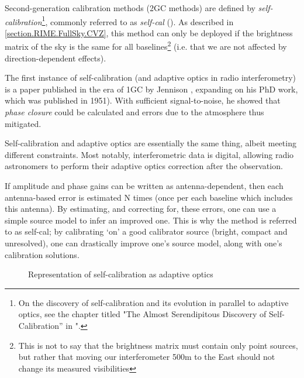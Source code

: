 \pg
Second-generation calibration methods (2GC methods) are defined by \emph{self-calibration}\footnote{On the discovery of self-calibration and its evolution in parallel to adaptive optics, see the chapter titled "The Almost Serendipitous Discovery of Self-Calibration'' in "\href{http://library.nrao.edu/public/collection/02000000000280.pdf}{\citep{serendipitous}}.}, commonly referred to as \emph{self-cal} (). As described in \cref{section.RIME.FullSky.CVZ}, this method can only be deployed if the brightness matrix of the sky is the same for all baselines\footnote{This is not to say that the brightness matrix must contain only point sources, but rather that moving our interferometer 500m to the East should not change its measured visibilities} (i.e. that we are not affected by direction-dependent effects).

\pg
The first instance of self-calibration (and adaptive optics in radio interferometry) is a paper published in the era of 1GC by Jennison , expanding on his PhD work, which was published in 1951). With sufficient signal-to-noise, he showed that \emph{phase closure} could be calculated and errors due to the atmosphere thus mitigated.

\pg
Self-calibration and adaptive optics are essentially the same thing, albeit meeting different constraints. Most notably, interferometric data is digital, allowing radio astronomers to perform their adaptive optics correction after the observation.

\pg
If amplitude and phase gains can be written as antenna-dependent, then each antenna-based error is estimated N times (once per each baseline which includes this antenna). By estimating, and correcting for, these errors, one can use a simple source model to infer an improved one. This is why the method is referred to as self-cal; by calibrating `on' a good calibrator source (bright, compact and unresolved), one can drastically improve one's source model, along with one's calibration solutions.


\begin{figure}[h!]
\centering
{}
\caption{\label{fig.selfcal} Representation of self-calibration as adaptive optics}
\end{figure}

